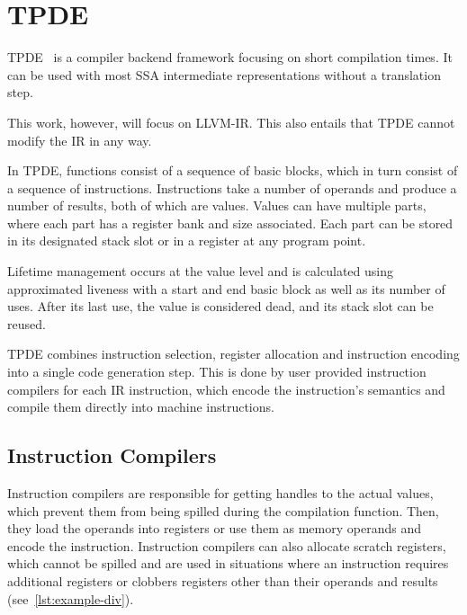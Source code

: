 \section{TPDE}
\label{sec:tpde}

TPDE~\cite{tpde} is a compiler backend framework focusing on short compilation times. It can be used with most SSA intermediate representations without a translation step.

This work, however, will focus on LLVM-IR. This also entails that TPDE cannot modify the IR in any way.

In TPDE, functions consist of a sequence of basic blocks, which in turn consist of a sequence of instructions. 
Instructions take a number of operands and produce a number of results, both of which are values.
Values can have multiple parts, where each part has a register bank and size associated. Each part can be stored in its designated stack slot or in a register at any program point. 

Lifetime management occurs at the value level and is calculated using approximated liveness with a start and end basic block as well as its number of uses. After its last use, the value is considered dead, and its stack slot can be reused.

TPDE combines instruction selection, register allocation and instruction encoding into a single code generation step. This is done by user provided instruction compilers for each IR instruction, which encode the instruction's semantics and compile them directly into machine instructions.
\subsection{Instruction Compilers}

Instruction compilers are responsible for getting handles to the actual values, which prevent them from being spilled during the compilation function. 
Then, they load the operands into registers or use them as memory operands and encode the instruction. 
 Instruction compilers can also allocate scratch registers, which cannot be spilled and are used in situations where an instruction requires additional registers or clobbers registers other than their operands and results (see~\autoref{lst:example-div}).



